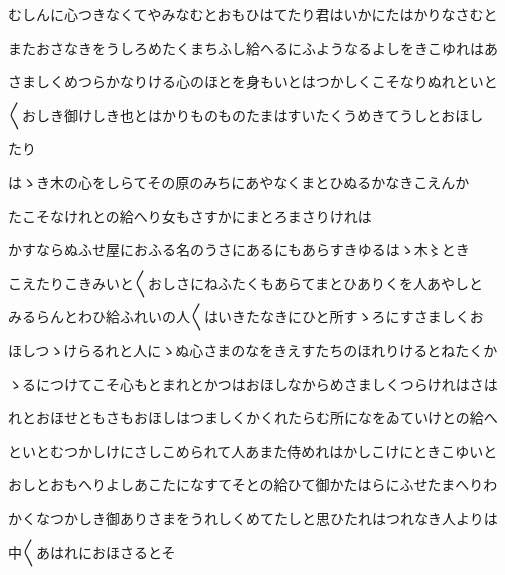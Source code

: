 \documentclass[a4paper,11pt,landscape]{ltjtarticle}
\begin{document}
\par\medskip
むしんに心つきなくてやみなむとおもひはてたり君はいかにたはかりなさむと
\par\medskip
またおさなきをうしろめたくまちふし給へるにふようなるよしをきこゆれはあ
\par\medskip
さましくめつらかなりける心のほとを身もいとはつかしくこそなりぬれといと
\par\medskip
〱おしき御けしき也とはかりものものたまはすいたくうめきてうしとおほし
\par\medskip
たり
\par\medskip
はゝき木の心をしらてその原のみちにあやなくまとひぬるかなきこえんか
\par\medskip
たこそなけれとの給へり女もさすかにまとろまさりけれは
\par\medskip
かすならぬふせ屋におふる名のうさにあるにもあらすきゆるはゝ木〻とき
\par\medskip
こえたりこきみいと〱おしさにねふたくもあらてまとひありくを人あやしと
\par\medskip
みるらんとわひ給ふれいの人〱はいきたなきにひと所すゝろにすさましくお
\par\medskip
ほしつゝけらるれと人にゝぬ心さまのなをきえすたちのほれりけるとねたくか
\par\medskip
ゝるにつけてこそ心もとまれとかつはおほしなからめさましくつらけれはさは
\par\medskip
れとおほせともさもおほしはつましくかくれたらむ所になをゐていけとの給へ
\par\medskip
といとむつかしけにさしこめられて人あまた侍めれはかしこけにときこゆいと
\par\medskip
おしとおもへりよしあこたになすてそとの給ひて御かたはらにふせたまへりわ
\par\medskip
かくなつかしき御ありさまをうれしくめてたしと思ひたれはつれなき人よりは
\par\medskip
中〱あはれにおほさるとそ
\par\medskip
\end{document}
